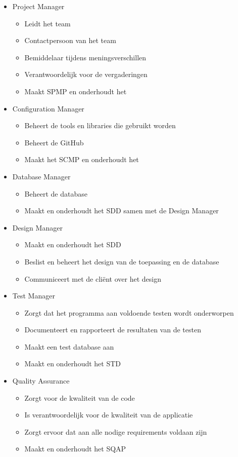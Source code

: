 \begin{itemize}
\item Project Manager
\begin{itemize}
\item Leidt het team
\item Contactpersoon van het team
\item Bemiddelaar tijdens meningsverschillen
\item Verantwoordelijk voor de vergaderingen
\item Maakt SPMP en onderhoudt het
\end{itemize}

\item Configuration Manager
\begin{itemize}
\item Beheert de tools en libraries die gebruikt worden
\item Beheert de GitHub
\item Maakt het SCMP en onderhoudt het
\end{itemize}

\item Database Manager
\begin{itemize}
\item Beheert de database
\item Maakt en onderhoudt het SDD samen met de Design Manager
\end{itemize}

\item Design Manager
\begin{itemize}
\item Maakt en onderhoudt het SDD 
\item Beslist en beheert het design van de toepassing en de database
\item Communiceert met de cliënt over het design
\end{itemize}

\item Test Manager
\begin{itemize}
\item Zorgt dat het programma aan voldoende testen wordt onderworpen
\item Documenteert en rapporteert de resultaten van de testen
\item Maakt een test database aan
\item Maakt en onderhoudt het STD
\end{itemize}

\item Quality Assurance
 \begin{itemize}
 \item Zorgt voor de kwaliteit van de code
 \item Is verantwoordelijk voor de kwaliteit van de applicatie
 \item Zorgt ervoor dat aan alle nodige requirements voldaan zijn
 \item Maakt en onderhoudt het SQAP
 \end{itemize}
 

\end{itemize}

